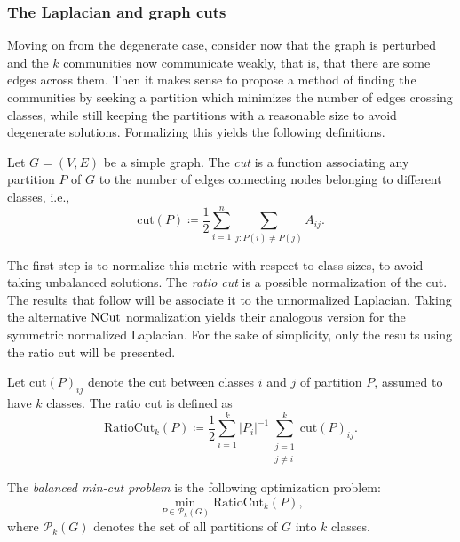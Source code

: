 \documentclass[../../main.tex]{subfiles} %
\begin{document}
\subsubsection{The Laplacian and graph cuts}  %
Moving on from the degenerate case, consider now that the graph is perturbed 
and the \(k\) communities now communicate weakly, that is, that there are 
some edges across them. Then it makes sense to propose a method of finding 
the communities by seeking a partition which minimizes the number of edges 
crossing classes, while still keeping the partitions with a reasonable size to 
avoid degenerate solutions. Formalizing this yields the following definitions.
\begin{definition}  %
	Let \(G = (V, E)\) be a simple graph. The \textit{cut} is a function associating 
	any partition \(P\) of \(G\) to the number of edges connecting nodes 
	belonging to different classes, i.e.,
	\begin{equation}
		\text{cut}(P) \coloneqq \frac{1}{2} \sum_{i=1}^n  \sum_{j: P(i) \neq P(j)} 
		A_{ij}.
	\end{equation}
\end{definition}
The first step is to normalize this metric with respect to class sizes, to avoid 
taking unbalanced solutions. The \textit{ratio cut} is a possible normalization of 
the cut. The results that follow will be associate it to the unnormalized 
Laplacian. Taking the alternative \(\textup{NCut}\) normalization yields their 
analogous version for the symmetric normalized Laplacian. For the sake of 
simplicity, only the results using the ratio cut will be presented.
\begin{definition}  %
	Let \(\text{cut}(P)_{ij}\) denote the cut between classes \(i\) and \(j\) of 
	partition \(P\), assumed to have \(k\) classes. The ratio cut is defined as
	\begin{equation}
		\text{RatioCut}_k (P) \coloneqq \frac{1}{2} \sum_{i=1}^k \vert P_i 
		\vert^{-1} \sum_{\substack{j=1 \\ j \neq i}}^k \text{cut}(P)_{ij}.
	\end{equation}
\end{definition}
\begin{definition}  %
	The \textit{balanced min-cut problem} is the following optimization problem:
	\begin{equation} \label{eq:balanced-min-cut}
		\min_{P \in \mathcal P_k(G)} \text{RatioCut}_k(P),
	\end{equation} 
	where \(\mathcal P_k(G)\) denotes the set of all partitions of \(G\) into \(k\) 
	classes.
\end{definition}
\end{document}
